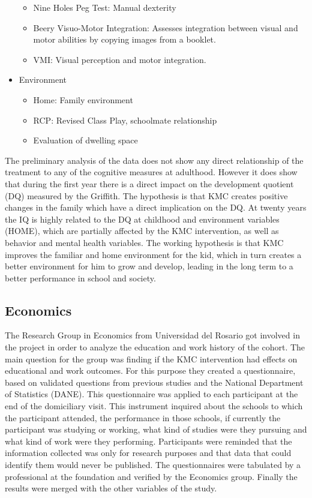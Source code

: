 \begin{itemize}
\begin{itemize}
		\item Nine Holes Peg Test: Manual dexterity
		\item Beery Visuo-Motor Integration: Assesses integration between visual and motor abilities by copying images from a booklet.
		\item VMI: Visual perception and motor integration.
	\end{itemize}
	\item Environment
	\begin{itemize}
		\item Home: Family environment
		\item RCP: Revised Class Play, schoolmate relationship
		\item Evaluation of dwelling space
	\end{itemize}
\end{itemize}

The preliminary analysis of the data does not show any direct relationship of the treatment to any of the cognitive measures at adulthood. However it does show that during the first year there is a direct impact on the development quotient (DQ) measured by the Griffith. The hypothesis is that KMC creates positive changes in the family which have a direct implication on the DQ. At twenty years the IQ is highly related to the DQ at childhood and  environment variables (HOME), which are partially affected by the KMC intervention, as well as behavior and mental health variables. The working hypothesis is that KMC improves the familiar and home environment for the kid, which in turn creates a better environment for him to grow and develop, leading in the long term to a better performance in school and society.
\subsection{Economics}

The Research Group in Economics from Universidad del Rosario got involved in the project in order to analyze the education and work history of the cohort. The main question for the group was finding if the KMC intervention had effects on educational and work outcomes.  For this purpose they created a questionnaire, based on validated questions from previous studies and the National Department of Statistics (DANE). This questionnaire was applied to each participant at the end of the domiciliary visit. This instrument inquired about the schools to which the participant attended, the performance in those schools, if currently the participant was studying or working, what kind of studies were they pursuing and what kind of work were they performing. Participants were reminded that the information collected was only for research purposes and that data that could identify them would never be published. The questionnaires were tabulated by a professional at the foundation and verified by the Economics group. Finally the results were merged with the other variables of the study.

